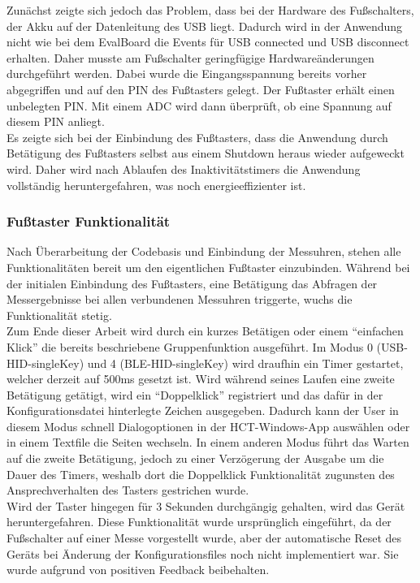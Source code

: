 Zunächst zeigte sich jedoch das Problem, dass bei der Hardware des Fußschalters, der Akku auf der Datenleitung des \ac{USB} liegt. Dadurch wird in der Anwendung nicht wie bei dem EvalBoard die Events für \ac{USB} connected und \ac{USB} disconnect erhalten. Daher musste am Fußschalter geringfügige Hardwareänderungen durchgeführt werden. Dabei wurde die Eingangsspannung bereits vorher abgegriffen und auf den PIN des Fußtasters gelegt. Der Fußtaster erhält einen unbelegten PIN. Mit einem ADC wird dann überprüft, ob eine Spannung auf diesem PIN anliegt.\\
Es zeigte sich bei der Einbindung des Fußtasters, dass die Anwendung durch Betätigung des Fußtasters selbst aus einem Shutdown heraus wieder aufgeweckt wird. Daher wird nach Ablaufen des Inaktivitätstimers die Anwendung vollständig heruntergefahren, was noch energieeffizienter ist.

\subsubsection{Fußtaster Funktionalität}
Nach Überarbeitung der Codebasis und Einbindung der Messuhren, stehen alle Funktionalitäten bereit um den eigentlichen Fußtaster einzubinden. Während bei der initialen Einbindung des Fußtasters, eine Betätigung das Abfragen der Messergebnisse bei allen verbundenen Messuhren triggerte, wuchs die Funktionalität stetig.\\
Zum Ende dieser Arbeit wird durch ein kurzes Betätigen oder einem ``einfachen Klick'' die bereits beschriebene Gruppenfunktion ausgeführt. Im Modus 0 (USB-\ac{HID}-singleKey) und 4 (\ac{BLE}-\ac{HID}-singleKey) wird draufhin ein Timer gestartet, welcher derzeit auf 500ms gesetzt ist. Wird während seines Laufen eine zweite Betätigung getätigt, wird ein ``Doppelklick'' registriert und das dafür in der Konfigurationsdatei hinterlegte Zeichen ausgegeben. Dadurch kann der User in diesem Modus schnell Dialogoptionen in der \ac{HCT}-Windows-App auswählen oder in einem Textfile die Seiten wechseln. In einem anderen Modus führt das Warten auf die zweite Betätigung, jedoch zu einer Verzögerung der Ausgabe um die Dauer des Timers, weshalb dort die Doppelklick Funktionalität zugunsten des Ansprechverhalten des Tasters gestrichen wurde.\\
Wird der Taster hingegen für 3 Sekunden durchgängig gehalten, wird das Gerät heruntergefahren. Diese Funktionalität wurde ursprünglich eingeführt, da der Fußschalter auf einer Messe vorgestellt wurde, aber der automatische Reset des Geräts bei Änderung der Konfigurationsfiles noch nicht implementiert war. Sie wurde aufgrund von positiven Feedback beibehalten.

